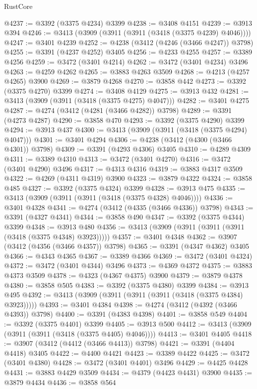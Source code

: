 \begin{lexlean}{RustCore}
\begin{coremodule}
@4237 := @3392 (@3375 @4234) @3399
@4238 := @3408 @4151
@4239 := @3913 @394
@4246 := @3413 (@3909 (@3911 (@3911 (@3418 (@3375 @4239) @4046))))
@4247 := @3401 @4239
@4252 := @4238 (@3412 (@4246 (@3466 @4247)) @3798)
@4255 := @3391 (@4237 @4252) @3405
@4256 := @4233 @4255
@4257 := @3389 @4256
@4259 := @3472 (@3401 @4214)
@4262 := @3472 (@3401 @4234) @3496
@4263 := @4259 @4262
@4265 := @3883 @4263 @3509
@4268 := @4213 (@4257 @4265) @3900
@4269 := @3879 @4268
@4270 := @3858 @442
@4273 := @3392 (@3375 @4270) @3399
@4274 := @3408 @4129
@4275 := @3913 @432
@4281 := @3413 (@3909 (@3911 (@3418 (@3375 @4275) @4047)))
@4282 := @3401 @4275
@4287 := @4274 (@3412 (@4281 (@3466 @4282)) @3798)
@4289 := @3391 (@4273 @4287)
@4290 := @3858 @470
@4293 := @3392 (@3375 @4290) @3399
@4294 := @3913 @437
@4300 := @3413 (@3909 (@3911 (@3418 (@3375 @4294) @4047)))
@4301 := @3401 @4294
@4306 := @4238 (@3412 (@4300 (@3466 @4301)) @3798)
@4309 := @3391 (@4293 @4306) @3405
@4310 := @4289 @4309
@4311 := @3389 @4310
@4313 := @3472 (@3401 @4270)
@4316 := @3472 (@3401 @4290) @3496
@4317 := @4313 @4316
@4319 := @3883 @4317 @3509
@4322 := @4269 (@4311 @4319) @3900
@4323 := @3879 @4322
@4324 := @3858 @485
@4327 := @3392 (@3375 @4324) @3399
@4328 := @3913 @475
@4335 := @3413 (@3909 (@3911 (@3911 (@3418 (@3375 @4328) @4046))))
@4336 := @3401 @4328
@4341 := @4274 (@3412 (@4335 (@3466 @4336)) @3798)
@4343 := @3391 (@4327 @4341)
@4344 := @3858 @490
@4347 := @3392 (@3375 @4344) @3399
@4348 := @3913 @480
@4356 := @3413 (@3909 (@3911 (@3911 (@3911 (@3418 (@3375 @4348) @3923)))))
@4357 := @3401 @4348
@4362 := @3907 (@3412 (@4356 (@3466 @4357)) @3798)
@4365 := @3391 (@4347 @4362) @3405
@4366 := @4343 @4365
@4367 := @3389 @4366
@4369 := @3472 (@3401 @4324)
@4372 := @3472 (@3401 @4344) @3496
@4373 := @4369 @4372
@4375 := @3883 @4373 @3509
@4378 := @4323 (@4367 @4375) @3900
@4379 := @3879 @4378
@4380 := @3858 @505
@4383 := @3392 (@3375 @4380) @3399
@4384 := @3913 @495
@4392 := @3413 (@3909 (@3911 (@3911 (@3911 (@3418 (@3375 @4384) @3923)))))
@4393 := @3401 @4384
@4398 := @4274 (@3412 (@4392 (@3466 @4393)) @3798)
@4400 := @3391 (@4383 @4398)
@4401 := @3858 @549
@4404 := @3392 (@3375 @4401) @3399
@4405 := @3913 @500
@4412 := @3413 (@3909 (@3911 (@3911 (@3418 (@3375 @4405) @4046))))
@4413 := @3401 @4405
@4418 := @3907 (@3412 (@4412 (@3466 @4413)) @3798)
@4421 := @3391 (@4404 @4418) @3405
@4422 := @4400 @4421
@4423 := @3389 @4422
@4425 := @3472 (@3401 @4380)
@4428 := @3472 (@3401 @4401) @3496
@4429 := @4425 @4428
@4431 := @3883 @4429 @3509
@4434 := @4379 (@4423 @4431) @3900
@4435 := @3879 @4434
@4436 := @3858 @564

\end{coremodule}
\end{lexlean}

